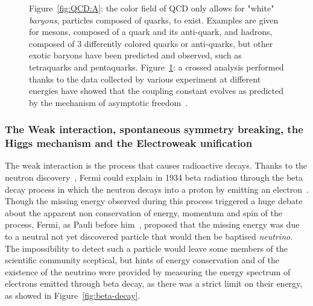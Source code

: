 \begin{figure}[H]
\begin{subfigure}{0.4\linewidth}
			\caption{\label{fig:QCD:B}}
		\end{subfigure}
		\caption{\label{fig:QCD} Figure~\ref{fig:QCD:A}: the color field of QCD only allows for "white" \textit{baryons}, particles composed of quarks, to exist. Examples are given for mesons, composed of a quark and its anti-quark, and hadrons, composed of 3 differently colored quarks or anti-quarks, but other exotic baryons have been predicted and observed, such as tetraquarks and pentaquarks. Figure~\ref{fig:QCD:B}: a crossed analysis performed thanks to the data collected by various experiment at different energies have showed that the coupling constant evolves as predicted by the mechanism of asymptotic freedom~\cite{BETHKE2003}.}
	\end{figure}
	
	\subsubsection*{The Weak interaction, spontaneous symmetry breaking, the Higgs mechanism and the Electroweak unification}
	\label{chapt2:sssec:HiggsEW}
	
	The weak interaction is the process that causes radioactive decays. Thanks to the neutron discovery~\cite{CHADWICK1932}, Fermi could explain in 1934 beta radiation through the beta decay process in which the neutron decays into a proton by emitting an electron~\cite{FERMI1934}. Though the missing energy observed during this process triggered a huge debate about the apparent non conservation of energy, momentum and spin of the process, Fermi, as Pauli before him~\cite{PAULI1930}, proposed that the missing energy was due to a neutral not yet discovered particle that would then be baptised \textit{neutrino}. The impossibility to detect such a particle would leave some members of the scientific community sceptical, but hints of energy conservation and of the existence of the neutrino were provided by measuring the energy spectrum of electrons emitted through beta decay, as there was a strict limit on their energy, as showed in Figure~\ref{fig:beta-decay}.
	
